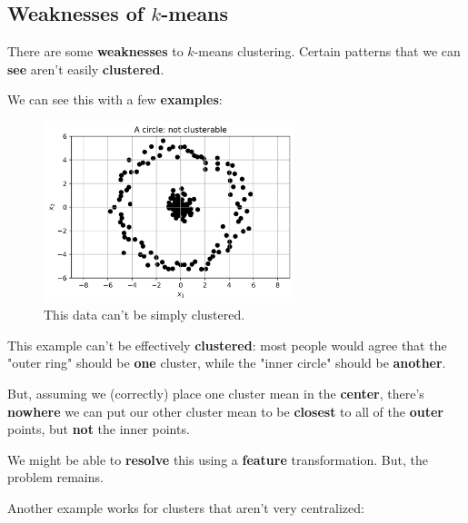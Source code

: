     \subsection*{Weaknesses of $k$-means}
    
        There are some \textbf{weaknesses} to $k$-means clustering. Certain patterns that we can \textbf{see} aren't easily \textbf{clustered}.
        
        We can see this with a few \textbf{examples}:
        
        \begin{figure}[h]
            \centering
            \includegraphics[width=0.65\textwidth]{images/clustering_images/center_unclusterable.png}
            \caption*{This data can't be simply clustered.}
        \end{figure}
        
        This example can't be effectively \textbf{clustered}: most people would agree that the "outer ring" should be \textbf{one} cluster, while the "inner circle" should be \textbf{another}.
        
        But, assuming we (correctly) place one cluster mean in the \textbf{center}, there's \textbf{nowhere} we can put our other cluster mean to be \textbf{closest} to all of the \textbf{outer} points, but \textbf{not} the inner points.
        
        We might be able to \textbf{resolve} this using a \textbf{feature} transformation. But, the problem remains.
            
        Another example works for clusters that aren't very centralized:
        
